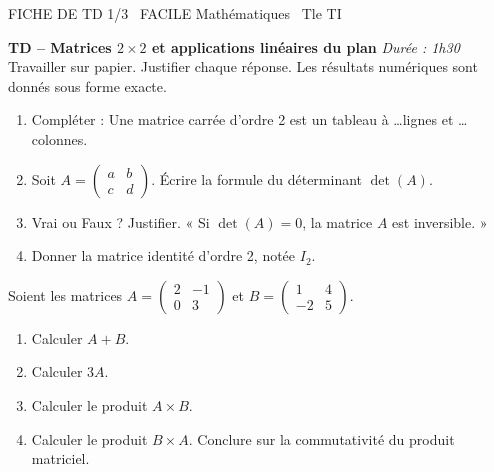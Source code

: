 \documentclass[11pt]{article}
\begin{document}
\begin{tcolorbox}[enhanced,colback=popink,colframe=popink,arc=10pt,boxrule=0pt,left=12pt,right=12pt,top=9pt,bottom=9pt]
{\color{white}\popxbold\small FICHE DE TD 1/3 \textbullet\ FACILE \hfill Mathématiques \textbullet\ Tle TI\par}
\end{tcolorbox}
\vspace{4pt}
\noindent \textbf{TD -- Matrices $2\times 2$ et applications linéaires du plan} \hfill \textit{Durée : 1h30} \\ 
Travailler sur papier. Justifier chaque réponse. Les résultats numériques sont donnés sous forme exacte.

\begin{exercice}
\begin{enumerate}
    \item Compléter : Une matrice carrée d'ordre 2 est un tableau à \ldots lignes et \ldots colonnes.
    \item Soit $A = \begin{pmatrix} a & b \\ c & d \end{pmatrix}$. Écrire la formule du déterminant $\det(A)$.
    \item Vrai ou Faux ? Justifier. « Si $\det(A) = 0$, la matrice $A$ est inversible. »
    \item Donner la matrice identité d'ordre 2, notée $I_2$.
\end{enumerate}
\end{exercice}

\begin{exercice}
Soient les matrices $A = \begin{pmatrix} 2 & -1 \\ 0 & 3 \end{pmatrix}$ et $B = \begin{pmatrix} 1 & 4 \\ -2 & 5 \end{pmatrix}$.
\begin{enumerate}
    \item Calculer $A + B$.
    \item Calculer $3A$.
    \item Calculer le produit $A \times B$.
    \item Calculer le produit $B \times A$. Conclure sur la commutativité du produit matriciel.
\end{enumerate}
\end{exercice}
\end{document}
